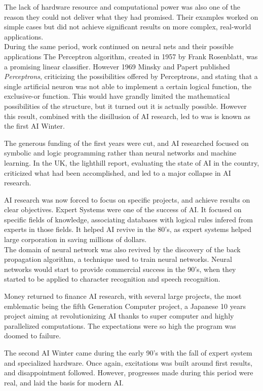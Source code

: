 \documentclass[12pt]{article}
\begin{document}
The lack of hardware resource and computational power was also one of the reason
they could not deliver what they had promised. Their examples worked on simple
cases but did not achieve significant results on more complex, real-world
applications.\\

During the same period, work continued on neural nets and their possible
applications The Perceptron algorithm, created in 1957 by Frank Rosenblatt, was
a promising linear classifier. However 1969 Minsky and Papert published {\em
Perceptrons}, criticizing the possibilities offered by Perceptrons, and stating
that a single artificial neuron was not able to implement a certain logical
function, the exclusive-or function. This would have grandly limited the mathematical
possibilities of the structure, but it turned out it is actually possible. However
this result, combined with the disillusion of AI research, led to was is known as
the first AI Winter.

The generous funding of the first years were cut, and AI researched focused on
symbolic and logic programming rather than neural networks and machine learning.
In the UK, the lighthill report, evaluating the state of AI in the country,
criticized what had been accomplished, and led to a major collapse in AI
research.

AI research was now forced to focus on specific projects, and achieve results on
clear objectives. Expert Systems were one of the success of AI. It focused on
specific fields of knowledge, associating databases with logical rules
infered from experts in those fields. It helped AI revive in the 80's, as expert
systems  helped large corporation in saving millions of dollars.\\

The domain of neural network was also revived by the discovery of the back
propagation algorithm, a technique used to train neural networks. Neural
networks would start to provide commercial success in the 90's, when they
started to be  applied to character recognition and speech recognition.

Money returned to finance AI research, with several large projects, the most
emblematic being the fifth Generation Computer project, a Japanese 10 years
project aiming at revolutionizing AI thanks to super computer and highly
parallelized computations. The expectations were so high the program was doomed
to failure.

The second AI Winter came during the early 90's with the fall of expert system
and  specialized hardware. Once again, excitations was built around first
results, and  disappointment followed. However, progresses made during this
period were real,  and laid the basis for modern AI.\\
\end{document}
